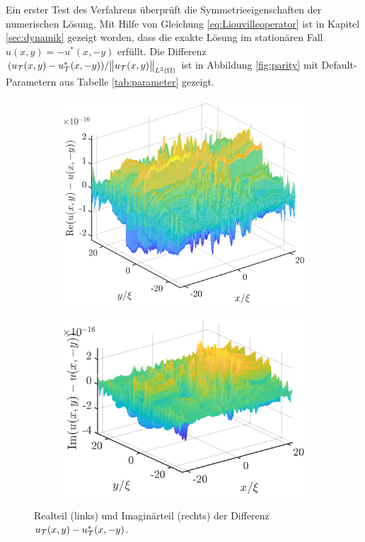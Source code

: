 Ein erster Test des Verfahrens überprüft die Symmetrieeigenschaften der numerischen Lösung. Mit Hilfe von Gleichung \eqref{eq:Liouvilleoperator} ist in Kapitel \ref{sec:dynamik} gezeigt worden, dass die exakte Lösung im stationären Fall $u(x,y) = -u^*(x,-y)$ erfüllt. Die Differenz $(u_{\mathcal{T}}(x,y)-u_{\mathcal{T}}^*(x,-y))/\norm{u_{\mathcal{T}}(x,y)}_{L^2(\Omega)}$ ist in Abbildung \ref{fig:parity} mit Default-Parametern aus Tabelle \ref{tab:parameter} gezeigt.
\begin{figure}
    \centering
    \begin{subfigure}[b]{0.475\textwidth}
        \centering
        \includegraphics[width=\textwidth]{plots/parity_real.eps}
        \caption[]%
        {{\small }}
    \end{subfigure}
    \hfill
    \begin{subfigure}[b]{0.475\textwidth}
        \centering
        \includegraphics[width=\textwidth]{plots/parity_imag.eps}
        \caption[]%
        {{\small }}
    \end{subfigure}
    \caption[]
    {Realteil (links) und Imaginärteil (rechts) der Differenz $u_{\mathcal{T}}(x,y)-u_{\mathcal{T}}^*(x,-y)$.}
    \label{fig:testResult}
\end{figure}


